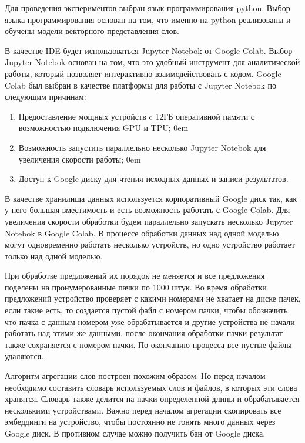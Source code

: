\documentclass[a4paper,14pt]{article}
\begin{document}
Для проведения экспериментов выбран язык программирования python.
Выбор языка программирования основан на том, что именно на python реализованы и обучены модели векторного представления слов.

В качестве IDE будет использоваться Jupyter Notebok от Google Colab.
Выбор Jupyter Notebok основан на том, что это удобный инструмент для аналитической работы, который позволяет интерактивно взаимодействовать с кодом.
Google Colab был выбран в качестве платформы для работы с Jupyter Notebok по следующим причинам:

\begin{enumerate}
	\itemsep0em 
	\item Предоставление мощных устройств c 12ГБ оперативной памяти с возможностью подключения GPU и TPU;
		\itemsep0em 
	\item Возможность запустить параллельно несколько Jupyter Notebok для увеличения скорости работы;
			\itemsep0em 
	\item Доступ к Google диску для чтения исходных данных и записи результатов.
\end{enumerate}

В качестве хранилища данных используется корпоративный Google диск так, как у него большая вместимость и есть возможность работать с Google Colab.
Для увеличения скорости обработки будем параллельно запускать несколько Jupyter Notebok в Google Colab.
В процессе обработки данных над одной моделью могут одновременно работать несколько устройств, но одно устройство работает только над одной моделью.

При обработке предложений их порядок не меняется и все предложения поделены на пронумерованные пачки по 1000 штук.
Во время обработки предложений устройство проверяет с какими номерами не хватает на диске пачек, если такие есть, то создается пустой файл с номером пачки, чтобы обозначить, что пачка с данным номером уже обрабатывается и другие устройства не начали работать над этими же данными.
после окончания обработки пачки результат также сохраняется с номером пачки.
По окончанию процесса все пустые файлы удаляются.

Алгоритм агрегации слов построен похожим образом.
Но перед началом необходимо составить словарь используемых слов и файлов, в которых эти слова хранятся.
Словарь также делится на пачки определенной длины и обрабатывается несколькими устройствами.
Важно перед началом агрегации скопировать все эмбеддинги на устройство, чтобы постоянно не гонять много данных через Google диск.
В противном случае можно получить бан от Google диска.
\end{document}
